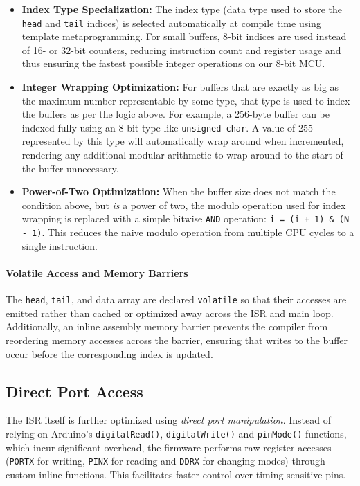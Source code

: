 \begin{itemize}
\item \textbf{Index Type Specialization:} The index type (data type used to store the \texttt{head} and \texttt{tail} indices) is selected automatically at compile time using template metaprogramming. For small buffers, 8-bit indices are used instead of 16- or 32-bit counters, reducing instruction count and register usage and thus ensuring the fastest possible integer operations on our 8-bit MCU.
\item \textbf{Integer Wrapping Optimization:} For buffers that are exactly as big as the maximum number representable by some type, that type is used to index the buffers as per the logic above. For example, a 256-byte buffer can be indexed fully using an 8-bit type like \texttt{unsigned char}. A value of 255 represented by this type will automatically wrap around when incremented, rendering any additional modular arithmetic to wrap around to the start of the buffer unnecessary.
\item \textbf{Power-of-Two Optimization:} When the buffer size does not match the condition above, but \emph{is} a power of two, the modulo operation used for index wrapping is replaced with a simple bitwise \texttt{AND} operation: \texttt{i = (i + 1) \& (N - 1)}. This reduces the naive modulo operation from multiple CPU cycles to a single instruction.
\end{itemize}

\paragraph{Volatile Access and Memory Barriers} The \texttt{head}, \texttt{tail}, and data array are declared \texttt{volatile} so that their accesses are emitted rather than cached or optimized away across the ISR and main loop. Additionally, an inline assembly memory barrier prevents the compiler from reordering memory accesses across the barrier, ensuring that writes to the buffer occur before the corresponding index is updated.

\subsection{Direct Port Access} The ISR itself is further optimized using \emph{direct port manipulation}. Instead of relying on Arduino’s \texttt{digitalRead()}, \texttt{digitalWrite()} and \texttt{pinMode()} functions, which incur significant overhead, the firmware performs raw register accesses (\texttt{PORTX} for writing, \texttt{PINX} for reading and \texttt{DDRX} for changing modes) through custom inline functions. This facilitates faster control over timing-sensitive pins.

